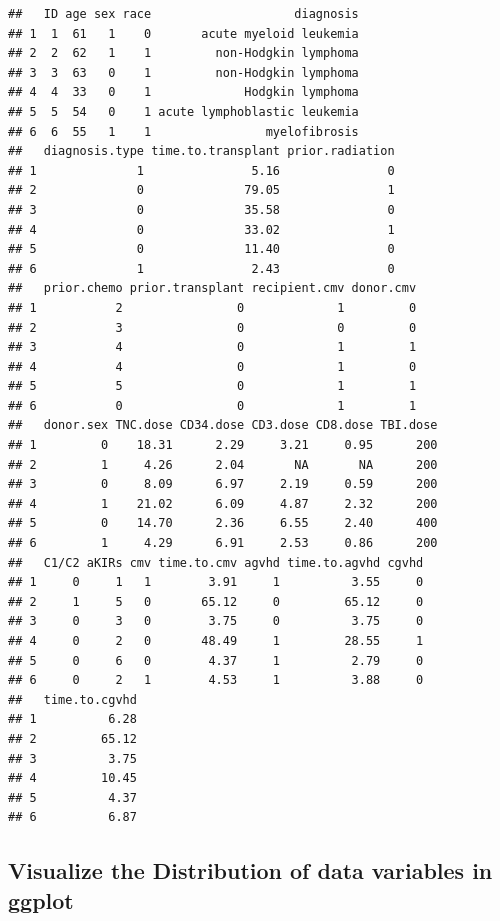 \documentclass[
]{book}
\begin{document}
\begin{verbatim}
##   ID age sex race                    diagnosis
## 1  1  61   1    0       acute myeloid leukemia
## 2  2  62   1    1         non-Hodgkin lymphoma
## 3  3  63   0    1         non-Hodgkin lymphoma
## 4  4  33   0    1             Hodgkin lymphoma
## 5  5  54   0    1 acute lymphoblastic leukemia
## 6  6  55   1    1                myelofibrosis
##   diagnosis.type time.to.transplant prior.radiation
## 1              1               5.16               0
## 2              0              79.05               1
## 3              0              35.58               0
## 4              0              33.02               1
## 5              0              11.40               0
## 6              1               2.43               0
##   prior.chemo prior.transplant recipient.cmv donor.cmv
## 1           2                0             1         0
## 2           3                0             0         0
## 3           4                0             1         1
## 4           4                0             1         0
## 5           5                0             1         1
## 6           0                0             1         1
##   donor.sex TNC.dose CD34.dose CD3.dose CD8.dose TBI.dose
## 1         0    18.31      2.29     3.21     0.95      200
## 2         1     4.26      2.04       NA       NA      200
## 3         0     8.09      6.97     2.19     0.59      200
## 4         1    21.02      6.09     4.87     2.32      200
## 5         0    14.70      2.36     6.55     2.40      400
## 6         1     4.29      6.91     2.53     0.86      200
##   C1/C2 aKIRs cmv time.to.cmv agvhd time.to.agvhd cgvhd
## 1     0     1   1        3.91     1          3.55     0
## 2     1     5   0       65.12     0         65.12     0
## 3     0     3   0        3.75     0          3.75     0
## 4     0     2   0       48.49     1         28.55     1
## 5     0     6   0        4.37     1          2.79     0
## 6     0     2   1        4.53     1          3.88     0
##   time.to.cgvhd
## 1          6.28
## 2         65.12
## 3          3.75
## 4         10.45
## 5          4.37
## 6          6.87
\end{verbatim}

\hypertarget{visualize-the-distribution-of-data-variables-in-ggplot}{%
\subsection{Visualize the Distribution of data variables in ggplot}\label{visualize-the-distribution-of-data-variables-in-ggplot}}
\end{document}
